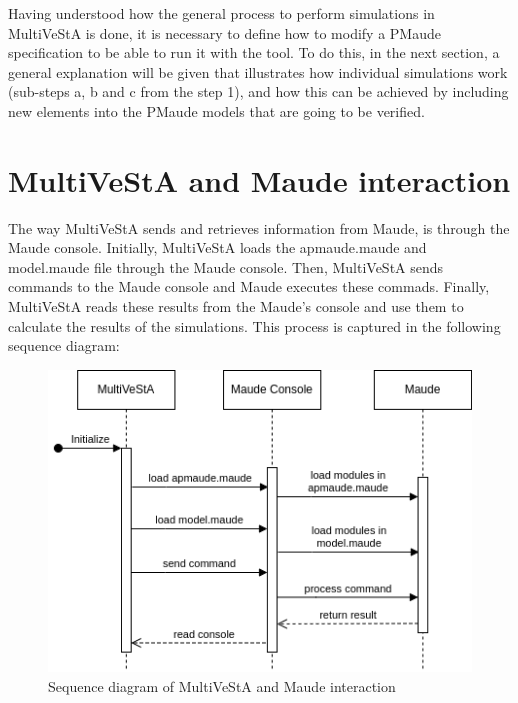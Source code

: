 Having understood how the general process to perform simulations in MultiVeStA is done, it is necessary to define how to modify a PMaude specification to be able to run it with the tool. To do this, in the next section, a general explanation will be given that illustrates how individual simulations work (sub-steps a, b and c from the step 1), and how this can be achieved by including new elements into the PMaude models that are going to be verified.

\section{MultiVeStA and Maude interaction}
The way MultiVeStA sends and retrieves information from Maude, is through the Maude console. Initially, MultiVeStA loads the apmaude.maude and model.maude file through the Maude console. Then, MultiVeStA sends commands to the Maude console and Maude executes these commads. Finally, MultiVeStA reads these results from the Maude's console and use them to calculate the results of the simulations. This process is captured in the following sequence diagram:

\begin{figure}[H]
    \centering
    \includegraphics[scale = 0.6]{images/multi4.png}
    \caption{Sequence diagram of MultiVeStA and Maude interaction}
    \label{fig:multi4}
\end{figure}

